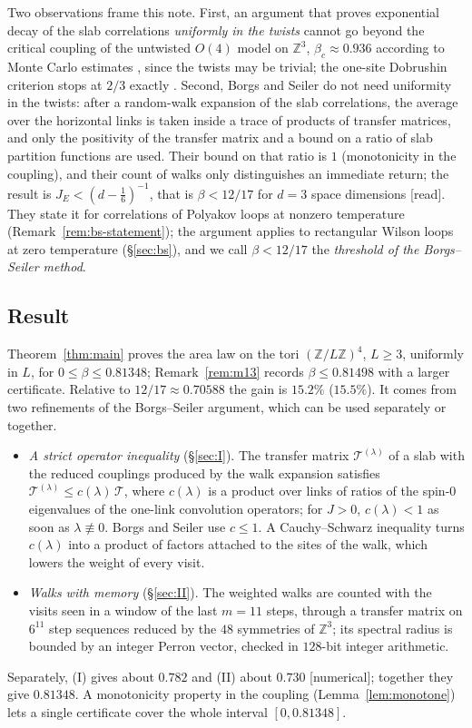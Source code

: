 \documentclass[11pt,a4paper]{article}
\theoremstyle{plain}
\theoremstyle{remark}
\numberwithin{equation}{section}
\newcommand{\Z}{\mathbb{Z}}
\newcommand{\cT}{\mathcal{T}}
\newcommand{\st}[1]{\textsf{[#1]}}
\begin{document}
Two observations frame this note. First, an argument that proves exponential decay of the slab correlations \emph{uniformly in the
twists} cannot go beyond the critical coupling of the untwisted $O(4)$ model on $\Z^3$, $\beta_c\approx0.936$ according to
Monte Carlo estimates \cite{KK95,CH98}, since the twists may be trivial; the one-site Dobrushin criterion stops at $2/3$ exactly \cite[Remark~7.6]{D7}.
Second, Borgs and Seiler \cite[Appendix~B]{BS83} do not need uniformity in the twists: after a random-walk expansion of the slab
correlations, the average over the horizontal links is taken inside a trace of products of transfer matrices, and only the positivity
of the transfer matrix and a bound on a ratio of slab partition functions are used. Their bound on that ratio is $1$ (monotonicity in
the coupling), and their count of walks only distinguishes an immediate return; the result is $J_E<(d-\frac16)^{-1}$, that is
$\beta<12/17$ for $d=3$ space dimensions \cite[(II.55), p.~343, and p.~376]{BS83} \st{read}. They state it for correlations of Polyakov loops at
nonzero temperature (Remark~\ref{rem:bs-statement}); the argument applies to rectangular Wilson loops at zero temperature
(\S\ref{sec:bs}), and we call $\beta<12/17$ the \emph{threshold of the Borgs--Seiler method}.

\subsection{Result}
Theorem~\ref{thm:main} proves the area law on the tori $(\Z/L\Z)^4$, $L\ge3$, uniformly in $L$, for $0\le\beta\le0.81348$;
Remark~\ref{rem:m13} records $\beta\le0.81498$ with a larger certificate. Relative to $12/17\approx0.70588$ the gain is $15.2\%$
($15.5\%$). It comes from two refinements of the Borgs--Seiler argument, which can be used separately or together.
\begin{itemize}
\item[(I)] \emph{A strict operator inequality} (\S\ref{sec:I}). The transfer matrix $\cT^{(\lambda)}$ of a slab with the reduced
couplings produced by the walk expansion satisfies $\cT^{(\lambda)}\le c(\lambda)\,\cT$, where $c(\lambda)$ is a product over links
of ratios of the spin-$0$ eigenvalues of the one-link convolution operators; for $J>0$, $c(\lambda)<1$ as soon as
$\lambda\not\equiv0$. Borgs
and Seiler use $c\le1$. A Cauchy--Schwarz inequality turns $c(\lambda)$ into a product of factors attached to the sites of the walk,
which lowers the weight of every visit.
\item[(II)] \emph{Walks with memory} (\S\ref{sec:II}). The weighted walks are counted with the visits seen in a window of the last
$m=11$ steps, through a transfer matrix on $6^{11}$ step sequences reduced by the $48$ symmetries of $\Z^3$; its spectral radius is
bounded by an integer Perron vector, checked in $128$-bit integer arithmetic.
\end{itemize}
Separately, (I) gives about $0.782$ and (II) about $0.730$ \st{numerical}; together they give $0.81348$. A monotonicity property in
the coupling (Lemma~\ref{lem:monotone}) lets a single certificate cover the whole interval $[0,0.81348]$.
\end{document}
